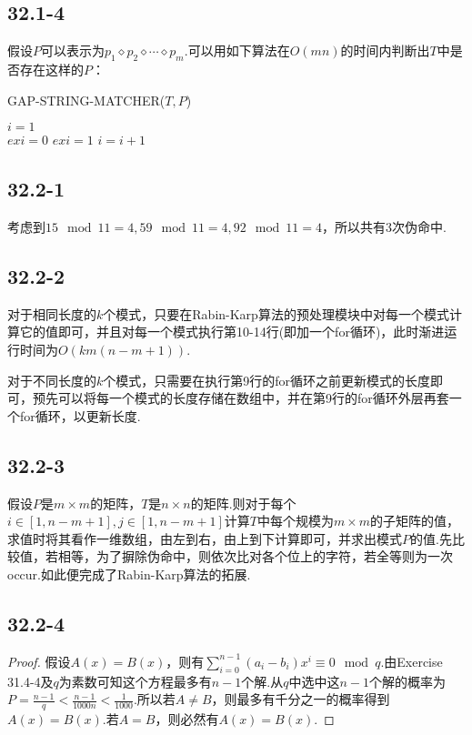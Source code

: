 \documentclass[twocolumn]{article}
\newenvironment{SChinese}{
	\CJKfamily{gbsn}
	\CJKtilde
	\CJKnospace}{}
\begin{document}
\begin{CJK}{UTF8}{}
\begin{SChinese}
			\subsection*{32.1-4}
				假设$P$可以表示为$p_1\diamond p_2\diamond\cdots\diamond p_m$.可以用如下算法在$O(mn)$的时间内判断出$T$中是否存在这样的$P$：
				\begin{algorithm}
					\caption{GAP-STRING-MATCHER($T,P$)}
					\begin{algorithmic}[1]
						\STATE $i=1$ \\
						\STATE $exi=0$
						\STATE $exi=1$
						\ENDIF
						\ENDFOR
						\RETURN\FALSE
						\ENDIF
						\STATE $i=i+1$ \\
						\ENDWHILE
						\RETURN\TRUE
					\end{algorithmic}
				\end{algorithm}
			\subsection*{32.2-1}
				考虑到$15\mod11=4,59\mod11=4,92\mod11=4$，所以共有3次伪命中.
			\subsection*{32.2-2}
				\indent
				
				对于相同长度的$k$个模式，只要在Rabin-Karp算法的预处理模块中对每一个模式计算它的值即可，并且对每一个模式执行第10-14行(即加一个for循环)，此时渐进运行时间为$O(km(n-m+1))$.
				
				对于不同长度的$k$个模式，只需要在执行第9行的for循环之前更新模式的长度即可，预先可以将每一个模式的长度存储在数组中，并在第9行的for循环外层再套一个for循环，以更新长度.
			\subsection*{32.2-3}
			\indent
			
				假设$P$是$m\times m$的矩阵，$T$是$n\times n$的矩阵.则对于每个$i\in[1,n-m+1],j\in[1,n-m+1]$计算$T$中每个规模为$m\times m$的子矩阵的值，求值时将其看作一维数组，由左到右，由上到下计算即可，并求出模式$P$的值.先比较值，若相等，为了摒除伪命中，则依次比对各个位上的字符，若全等则为一次occur.如此便完成了Rabin-Karp算法的拓展.
			\subsection*{32.2-4}
				\begin{proof}
					假设$A(x)=B(x)$，则有$\sum_{i=0}^{n-1}(a_i-b_i)x^i\equiv0\mod q$.由Exercise 31.4-4及$q$为素数可知这个方程最多有$n-1$个解.从$q$中选中这$n-1$个解的概率为$P=\frac{n-1}{q}<\frac{n-1}{1000n}<\frac{1}{1000}$.所以若$A\neq B$，则最多有千分之一的概率得到$A(x)=B(x)$.若$A=B$，则必然有$A(x)=B(x)$.
				\end{proof}

\end{SChinese}
\end{CJK}
\end{document}
